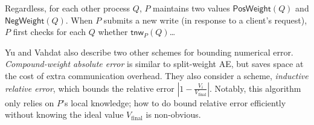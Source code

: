 \documentclass[]             %
{NASA}                       %
\newtheorem{corollary}[theorem]{Corollary}
\theoremstyle{definition}
\begin{document}
Regardless, for each other process $Q$, $P$ maintains two values
$\mathsf{PosWeight}(Q)$ and $\mathsf{NegWeight}(Q)$. When $P$ submits
a new write (in response to a client's request), $P$ first checks for
each $Q$ whether $\mathsf{tnw}_{P}(Q)$\ldots

Yu and Vahdat also describe two other schemes for bounding numerical
error. \emph{Compound-weight absolute error} is similar to
split-weight AE, but saves space at the cost of extra communication
overhead. They also consider a scheme, \emph{inductive relative
  error}, which bounds the relative error
$|1 - \frac{V_i}{V_{\textrm{final}}}|$. Notably, this algorithm only
relies on $P$'s local knowledge; how to do bound relative error
efficiently without knowing the ideal value $V_{\textrm{final}}$ is
non-obvious.

\end{document}
